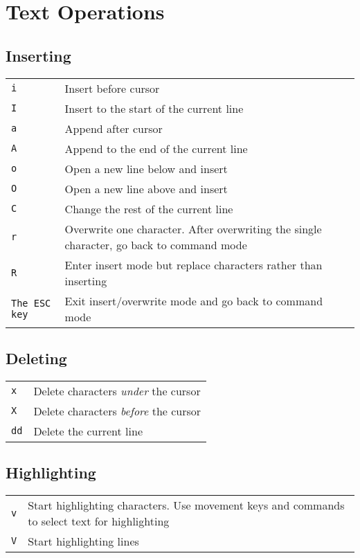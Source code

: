 \section{Text Operations}
\subsection{Inserting}
\begin{tabular}{@{}p{\the\MyLen}%
		  @{}p{\linewidth-\the\MyLen}}
\verb!i! 	& Insert before cursor\\
\verb!I!	& Insert to the start of the current line\\
\verb!a!	& Append after cursor\\
\verb!A!	& Append to the end of the current line\\
\verb!o!	& Open a new line below and insert\\
\verb!O!	& Open a new line above and insert\\
\verb!C!	& Change the rest of the current line\\
\verb!r!	& Overwrite one character. After overwriting the single character, go back to command mode\\
\verb!R!	& Enter insert mode but replace characters rather than inserting\\
\verb!The ESC key! &	Exit insert/overwrite mode and go back to command mode\\
\end{tabular}

\subsection{Deleting}
\begin{tabular}{@{}p{\the\MyLen}%
		  @{}p{\linewidth-\the\MyLen}}
\verb!x! & Delete characters \textit{under} the cursor\\
\verb!X! & Delete characters \textit{before} the cursor\\
\verb!dd! & Delete the current line
\end{tabular}

\subsection{Highlighting}
\begin{tabular}{@{}p{\the\MyLen}%
		  @{}p{\linewidth-\the\MyLen}}
\verb!v!	& Start highlighting characters. Use movement keys and commands to select text for highlighting\\
\verb!V!	& Start highlighting lines\\
\end{tabular}

